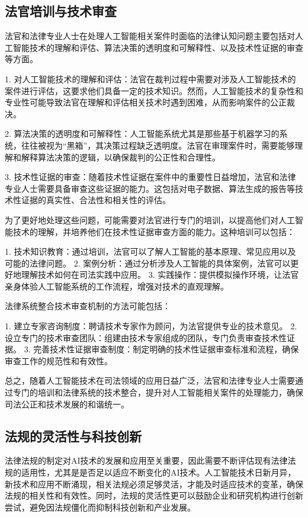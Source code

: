 \subsection{法官培训与技术审查}
法官和法律专业人士在处理人工智能相关案件时面临的法律认知问题主要包括对人工智能技术的理解和评估、算法决策的透明度和可解释性、以及技术性证据的审查等方面。

1. 对人工智能技术的理解和评估：法官在裁判过程中需要对涉及人工智能技术的案件进行评估，这要求他们具备一定的技术知识。然而，人工智能技术的复杂性和专业性可能导致法官在理解和评估相关技术时遇到困难，从而影响案件的公正裁决。

2. 算法决策的透明度和可解释性：人工智能系统尤其是那些基于机器学习的系统，往往被视为“黑箱”，其决策过程缺乏透明度。法官在审理案件时，需要能够理解和解释算法决策的逻辑，以确保裁判的公正性和合理性。

3. 技术性证据的审查：随着技术性证据在案件中的重要性日益增加，法官和法律专业人士需要具备审查这些证据的能力。这包括对电子数据、算法生成的报告等技术性证据的真实性、合法性和相关性的评估。

为了更好地处理这些问题，可能需要对法官进行专门的培训，以提高他们对人工智能技术的理解，并培养他们在技术性证据审查方面的能力。这种培训可以包括：

1. 技术知识教育：通过培训，法官可以了解人工智能的基本原理、常见应用以及可能的法律问题。
2. 案例分析：通过分析涉及人工智能的具体案例，法官可以更好地理解技术如何在司法实践中应用。
3. 实践操作：提供模拟操作环境，让法官亲身体验人工智能系统的工作流程，增强对技术的直观理解。

法律系统整合技术审查机制的方法可能包括：

1. 建立专家咨询制度：聘请技术专家作为顾问，为法官提供专业的技术意见。
2. 设立专门的技术审查团队：组建由技术专家组成的团队，专门负责审查技术性证据。
3. 完善技术性证据审查制度：制定明确的技术性证据审查标准和流程，确保审查工作的规范性和有效性。

总之，随着人工智能技术在司法领域的应用日益广泛，法官和法律专业人士需要通过专门的培训和法律系统的技术整合，提升对人工智能相关案件的处理能力，确保司法公正和技术发展的和谐统一。

\subsection{法规的灵活性与科技创新}
法律法规的制定对AI技术的发展和应用至关重要，因此需要不断评估现有法律法规的适用性，尤其是是否足以适应不断变化的AI技术。人工智能技术日新月异，新技术和应用不断涌现，相关法规必须足够灵活，才能及时适应技术的变革，确保法规的相关性和有效性。同时，法规的灵活性更可以鼓励企业和研究机构进行创新尝试，避免因法规僵化而抑制科技创新和产业发展。

